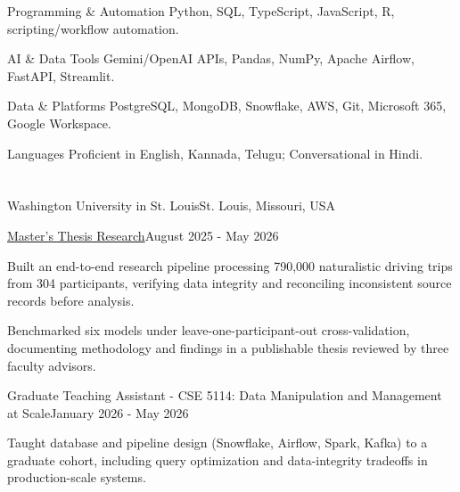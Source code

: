 \documentclass[10pt, letterpaper]{article}
\begin{document}
\vspace{\entrySpacing}
\begin{skillcategory}{Programming \& Automation}
	Python, SQL, TypeScript, JavaScript, R, scripting/workflow automation.
\end{skillcategory}

\vspace{\entrySpacing}
\begin{skillcategory}{AI \& Data Tools}
	Gemini/OpenAI APIs, Pandas, NumPy, Apache Airflow, FastAPI, Streamlit.
\end{skillcategory}

\vspace{\entrySpacing}
\begin{skillcategory}{Data \& Platforms}
	PostgreSQL, MongoDB, Snowflake, AWS, Git, Microsoft 365, Google Workspace.
\end{skillcategory}

\vspace{\entrySpacing}
\begin{skillcategory}{Languages}
	Proficient in English, Kannada, Telugu; Conversational in Hindi.
\end{skillcategory}

\vspace{\headerSpacing}


\section{}

\vspace{\entrySpacing}
\begin{leadershipentry}{Washington University in St. Louis}{St. Louis, Missouri, USA}
	\begin{positionentry}{\href{https://agreddy.com/projects/ms-thesis}{Master's Thesis Research}}{August 2025 - May 2026}
		\item Built an end-to-end research pipeline processing 790,000 naturalistic driving trips from 304 participants, verifying data integrity and reconciling inconsistent source records before analysis.
		\item Benchmarked six models under leave-one-participant-out cross-validation, documenting methodology and findings in a publishable thesis reviewed by three faculty advisors.
	\end{positionentry}
	\begin{positionentry}{Graduate Teaching Assistant - CSE 5114: Data Manipulation and Management at Scale}{January 2026 - May 2026}
		\item Taught database and pipeline design (Snowflake, Airflow, Spark, Kafka) to a graduate cohort, including query optimization and data-integrity tradeoffs in production-scale systems.
	\end{positionentry}
\end{leadershipentry}
\end{document}
